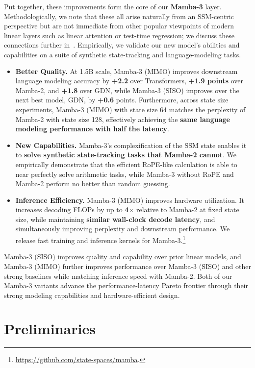 \documentclass{article}
\theoremstyle{plain}
\theoremstyle{definition}
\theoremstyle{remark}
\begin{document}
Put together, these improvements form the core of our \textbf{Mamba-3} layer.
Methodologically, we note that these all arise naturally from an SSM-centric perspective but are not immediate from other popular viewpoints of modern linear layers such as linear attention or test-time regression;
we discuss these connections further in~.
Empirically, we validate our new model's abilities and capabilities on a suite of synthetic state-tracking and language-modeling tasks.

\begin{itemize}[itemsep=0.1pt,topsep=0pt,leftmargin=*]
    \item \textbf{Better Quality.} 
    At 1.5B scale, Mamba-3 (MIMO) improves downstream language modeling accuracy by \textbf{+2.2} over Transformers, \textbf{+1.9 points} over Mamba-2, and \textbf{+1.8} over GDN, while Mamba-3 (SISO) improves over the next best model, GDN, by \textbf{+0.6} points.
    Furthermore, across state size experiments, Mamba-3 (MIMO) with state size 64 matches the perplexity of Mamba-2 with state size 128, effectively achieving the \textbf{same language modeling performance with half the latency}.
    \item \textbf{New Capabilities.} Mamba-3's complexification of the SSM state enables it to \textbf{solve synthetic state-tracking tasks that Mamba-2 cannot}. We empirically demonstrate that the efficient RoPE-like calculation is able to near perfectly solve arithmetic tasks, while Mamba-3 without RoPE and Mamba-2 perform no better than random guessing.
    \item \textbf{Inference Efficiency.} Mamba-3 (MIMO) improves hardware utilization. It increases decoding FLOPs by up to \textbf{4$\times$} relative to Mamba-2 at fixed state size, while maintaining \textbf{similar wall-clock decode latency}, and simultaneously improving perplexity and downstream performance. We release fast training and inference kernels for Mamba-3.\footnote{\url{https://github.com/state-spaces/mamba}.}
\end{itemize}

Mamba-3 (SISO) improves quality and capability over prior linear models, and Mamba-3 (MIMO) further improves performance over Mamba-3 (SISO) and other strong baselines while matching inference speed with Mamba-2.
Both of our Mamba-3 variants advance the performance-latency Pareto frontier through their strong modeling capabilities and hardware-efficient design.

\section{Preliminaries}
\end{document}
